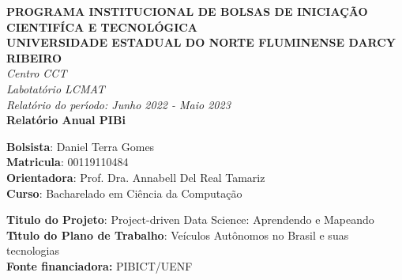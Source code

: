 \documentclass[
	12pt,				%
	openany, %
	a4paper,			%
	english,			%
	french,				%
	spanish,			%
	brazil				%
	]{abntex2}
\begin{document}
\begin{center}
\large
\textbf{PROGRAMA INSTITUCIONAL DE BOLSAS DE INICIA\c{C}\~{A}O CIENTIF\'{I}CA E TECNOL\'{O}GICA\\\vspace{0,5cm}
UNIVERSIDADE ESTADUAL DO NORTE FLUMINENSE DARCY RIBEIRO\\
}
\textit{Centro CCT \\
Labotat\'{o}rio LCMAT\\
\vspace{1cm}
Relat\'{o}rio do per\'{\i}odo: Junho 2022 - Maio 2023}\\
\vspace{1,5cm}
\textbf{Relat\'{o}rio Anual PIBi}\\\vspace{5cm}
\end{center}
\textbf{Bolsista}: Daniel Terra Gomes\\
\textbf{Matricula}: 00119110484\\
\textbf{Orientadora}: Prof. Dra. Annabell Del Real Tamariz  \\
\textbf{Curso}: Bacharelado em Ci\^{e}ncia da Computa\c{c}\~{a}o\\
\vspace{3cm}
\begin{center}
\textbf{Titulo do Projeto}: Project-driven Data Science: Aprendendo e Mapeando\\
\textbf{T\'{\i}tulo do Plano de Trabalho}: Veículos Autônomos no Brasil e suas tecnologias\\
\textbf{Fonte financiadora:} PIBICT/UENF
\end{center}




\frenchspacing




\end{document}
